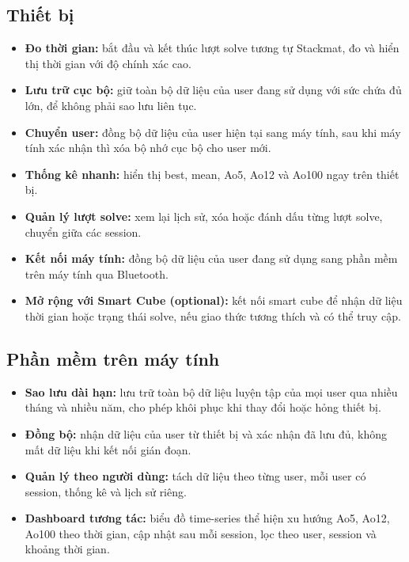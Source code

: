 \subsection{Thiết bị}
\begin{itemize}
    \item \textbf{Đo thời gian:} bắt đầu và kết thúc lượt solve tương tự Stackmat, đo và hiển thị thời gian với độ chính xác cao.
    \item \textbf{Lưu trữ cục bộ:} giữ toàn bộ dữ liệu của user đang sử dụng với sức chứa đủ lớn, để không phải sao lưu liên tục.
    \item \textbf{Chuyển user:} đồng bộ dữ liệu của user hiện tại sang máy tính, sau khi máy tính xác nhận thì xóa bộ nhớ cục bộ cho user mới.
    \item \textbf{Thống kê nhanh:} hiển thị best, mean, Ao5, Ao12 và Ao100 ngay trên thiết bị.
    \item \textbf{Quản lý lượt solve:} xem lại lịch sử, xóa hoặc đánh dấu từng lượt solve, chuyển giữa các session.
    \item \textbf{Kết nối máy tính:} đồng bộ dữ liệu của user đang sử dụng sang phần mềm trên máy tính qua Bluetooth.
    \item \textbf{Mở rộng với Smart Cube (optional):} kết nối smart cube để nhận dữ liệu thời gian hoặc trạng thái solve, nếu giao thức tương thích và có thể truy cập.
\end{itemize}

\subsection{Phần mềm trên máy tính}
\begin{itemize}
    \item \textbf{Sao lưu dài hạn:} lưu trữ toàn bộ dữ liệu luyện tập của mọi user qua nhiều tháng và nhiều năm, cho phép khôi phục khi thay đổi hoặc hỏng thiết bị.
    \item \textbf{Đồng bộ:} nhận dữ liệu của user từ thiết bị và xác nhận đã lưu đủ, không mất dữ liệu khi kết nối gián đoạn.
    \item \textbf{Quản lý theo người dùng:} tách dữ liệu theo từng user, mỗi user có session, thống kê và lịch sử riêng.
    \item \textbf{Dashboard tương tác:} biểu đồ time-series thể hiện xu hướng Ao5, Ao12, Ao100 theo thời gian, cập nhật sau mỗi session, lọc theo user, session và khoảng thời gian.
\end{itemize}


